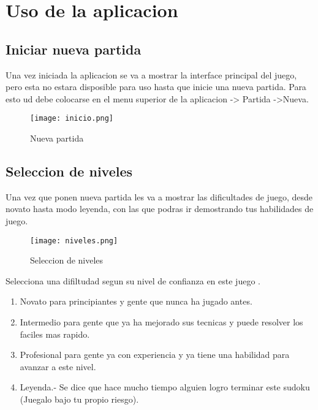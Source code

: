 \documentclass[11pt,fleqn]{book} %
\begin{document}
\chapter{Uso de la aplicacion}

\section{Iniciar nueva partida}

Una vez iniciada la aplicacion se va a mostrar la interface principal del juego, pero esta no estara disposible para uso hasta que inicie una nueva partida.
Para esto ud debe colocarse en el menu superior de la aplicacion -> Partida ->Nueva.


\begin{figure}[H]
\centering\texttt{[image: inicio.png]}
\caption{Nueva partida}
\end{figure}


\section{Seleccion de niveles}

Una vez que ponen nueva partida les va a mostrar las dificultades de juego, desde novato hasta modo leyenda, con las que podras ir demostrando tus habilidades de juego.

\begin{figure}[H]
\centering\texttt{[image: niveles.png]}
\caption{Seleccion de niveles}
\end{figure}


Selecciona una difiltudad segun su nivel de confianza en este juego .
\begin{enumerate}
\item Novato para principiantes y gente que nunca ha jugado antes.
\item Intermedio para gente que ya ha mejorado sus tecnicas y puede resolver los faciles mas rapido.
\item Profesional para gente ya con experiencia y ya tiene una habilidad para avanzar a este nivel.
\item Leyenda.- Se dice que hace mucho tiempo alguien logro terminar este sudoku (Juegalo bajo tu propio riesgo).
\end{enumerate}


\end{document}
